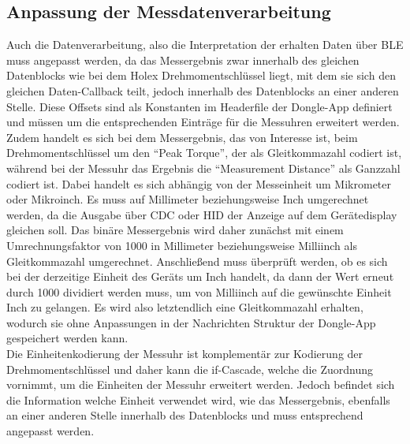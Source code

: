 \subsection{Anpassung der Messdatenverarbeitung}
Auch die Datenverarbeitung, also die Interpretation der erhalten Daten über \ac{BLE} muss angepasst werden, da das Messergebnis zwar innerhalb des gleichen Datenblocks wie bei dem Holex Drehmomentschlüssel liegt, mit dem sie sich den gleichen Daten-Callback teilt, jedoch innerhalb des Datenblocks an einer anderen Stelle. Diese Offsets sind als Konstanten im Headerfile der Dongle-App definiert und müssen um die entsprechenden Einträge für die Messuhren erweitert werden. Zudem handelt es sich bei dem Messergebnis, das von Interesse ist, beim Drehmomentschlüssel um den ``Peak Torque'', der als Gleitkommazahl codiert ist, während bei der Messuhr das Ergebnis die ``Measurement Distance'' als Ganzzahl codiert ist. Dabei handelt es sich abhängig von der Messeinheit um Mikrometer oder Mikroinch. Es muss auf Millimeter beziehungsweise Inch umgerechnet werden, da die Ausgabe über CDC oder \ac{HID} der Anzeige auf dem Gerätedisplay gleichen soll. Das binäre Messergebnis wird daher zunächst mit einem Umrechnungsfaktor von 1000 in Millimeter beziehungsweise Milliinch als Gleitkommazahl umgerechnet. Anschließend muss überprüft werden, ob es sich bei der derzeitige Einheit des Geräts um Inch handelt, da dann der Wert erneut durch 1000 dividiert werden muss, um von Milliinch auf die gewünschte Einheit Inch zu gelangen. Es wird also letztendlich eine Gleitkommazahl erhalten, wodurch sie ohne Anpassungen in der Nachrichten Struktur der Dongle-App gespeichert werden kann.\\
Die Einheitenkodierung der Messuhr ist komplementär zur Kodierung der Drehmomentschlüssel und daher kann die if-Cascade, welche die Zuordnung vornimmt, um die Einheiten der Messuhr erweitert werden. Jedoch befindet sich die Information welche Einheit verwendet wird, wie das Messergebnis, ebenfalls an einer anderen Stelle innerhalb des Datenblocks und muss entsprechend angepasst werden.

